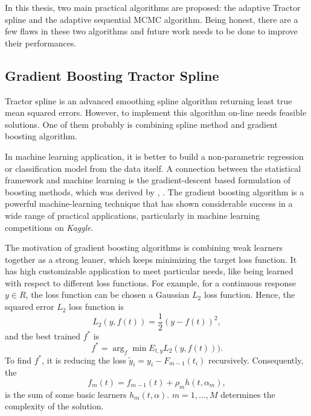 
In this thesis, two main practical algorithms are proposed: the adaptive Tractor spline and the adaptive sequential MCMC algorithm. Being honest, there are a few flaws in these two algorithms and future work needs to be done to improve their performances. 


\subsection*{Gradient Boosting Tractor Spline}

Tractor spline is an advanced smoothing spline algorithm returning least true mean squared errors. However, to implement this algorithm on-line needs feasible solutions. One of them probably is combining spline method and gradient boosting algorithm. 


In machine learning application, it is better to build a non-parametric regression or classification model from the data itself. A connection between the statistical framework and machine learning is the gradient-descent based formulation of boosting methods, which was derived by \cite{freund1995desicion}, \cite{friedman2001greedy}. The gradient boosting algorithm is a powerful machine-learning technique that has shown considerable success in a wide range of practical applications, particularly in machine learning competitions on \textit{Kaggle}. 


The motivation of gradient boosting algorithms is combining weak learners together as a strong leaner, which keeps minimizing the target loss function. 
It has high customizable application to meet particular needs, like being learned with respect to different loss functions. For example, for a continuous response $y\in \mathit{R}$, the loss function can be chosen a Gaussian $L_2$ loss function. Hence, the squared error $L_2$ loss function is 
\begin{equation*}
L_2(y,f(t)) = \frac{1}{2}\left(y-f(t)\right)^2,
\end{equation*}
and the best trained $f^*$ is 
\begin{equation*}
f^* = \arg_{f}\min E_{t,y}L_2(y,f(t))).
\end{equation*}
To find $f^*$, it is reducing the loss $\tilde{y}_i=y_i-F_{m-1}(t_i)$ recursively. Consequently, the 
\begin{equation*}
f_m(t) = f_{m-1}(t)+ \rho_mh(t,\alpha_m),
\end{equation*}
is the sum of some basic learners $h_m(t,\alpha)$. $m=1,\ldots,M$ determines the complexity of the solution. 


